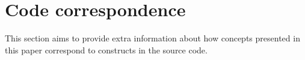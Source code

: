 \chapter{Code correspondence}
\label{app:correspondence}

This section aims to provide extra information about how concepts presented in this paper correspond to constructs in the source code.


